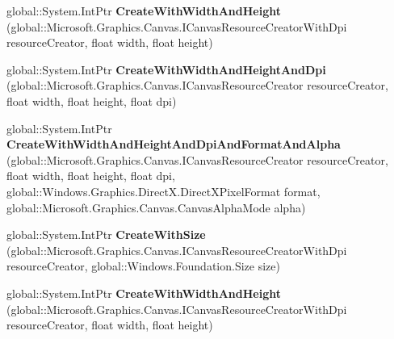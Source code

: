 \begin{DoxyCompactItemize}
\item 
\mbox{\label{interface_microsoft_1_1_graphics_1_1_canvas_1_1_i_canvas_render_target_factory_afd51138794b4d13559098c29d90fa247}} 
global\+::\+System.\+Int\+Ptr {\bfseries Create\+With\+Width\+And\+Height} (global\+::\+Microsoft.\+Graphics.\+Canvas.\+I\+Canvas\+Resource\+Creator\+With\+Dpi resource\+Creator, float width, float height)
\item 
\mbox{\label{interface_microsoft_1_1_graphics_1_1_canvas_1_1_i_canvas_render_target_factory_a4955cd48960b91634ca9ebaf71914d35}} 
global\+::\+System.\+Int\+Ptr {\bfseries Create\+With\+Width\+And\+Height\+And\+Dpi} (global\+::\+Microsoft.\+Graphics.\+Canvas.\+I\+Canvas\+Resource\+Creator resource\+Creator, float width, float height, float dpi)
\item 
\mbox{\label{interface_microsoft_1_1_graphics_1_1_canvas_1_1_i_canvas_render_target_factory_a25958fedb26248394e6b8cfbc8e3de9f}} 
global\+::\+System.\+Int\+Ptr {\bfseries Create\+With\+Width\+And\+Height\+And\+Dpi\+And\+Format\+And\+Alpha} (global\+::\+Microsoft.\+Graphics.\+Canvas.\+I\+Canvas\+Resource\+Creator resource\+Creator, float width, float height, float dpi, global\+::\+Windows.\+Graphics.\+Direct\+X.\+Direct\+X\+Pixel\+Format format, global\+::\+Microsoft.\+Graphics.\+Canvas.\+Canvas\+Alpha\+Mode alpha)
\item 
\mbox{\label{interface_microsoft_1_1_graphics_1_1_canvas_1_1_i_canvas_render_target_factory_ac73767c2259e7be23e5908d0eb7862f9}} 
global\+::\+System.\+Int\+Ptr {\bfseries Create\+With\+Size} (global\+::\+Microsoft.\+Graphics.\+Canvas.\+I\+Canvas\+Resource\+Creator\+With\+Dpi resource\+Creator, global\+::\+Windows.\+Foundation.\+Size size)
\item 
\mbox{\label{interface_microsoft_1_1_graphics_1_1_canvas_1_1_i_canvas_render_target_factory_afd51138794b4d13559098c29d90fa247}} 
global\+::\+System.\+Int\+Ptr {\bfseries Create\+With\+Width\+And\+Height} (global\+::\+Microsoft.\+Graphics.\+Canvas.\+I\+Canvas\+Resource\+Creator\+With\+Dpi resource\+Creator, float width, float height)

\end{DoxyCompactItemize}

